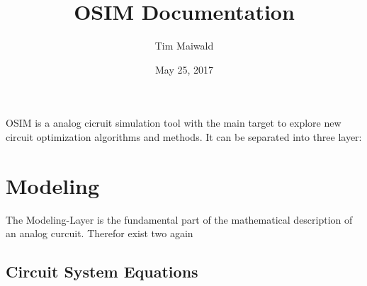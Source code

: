 \documentclass[letterpaper,12pt,english]{sphinxmanual}
\title{OSIM Documentation}
\date{May 25, 2017}
\author{Tim Maiwald}
\begin{document}
\maketitle
\sphinxtableofcontents
{}\label{\detokenize{index::doc}}


OSIM is a analog cicruit simulation tool with the main target to explore new circuit optimization algorithms and methods. It can be separated into three layer:


\chapter{Modeling}
\label{\detokenize{Modeling:welcome-to-osim-s-documentation}}\label{\detokenize{Modeling::doc}}\label{\detokenize{Modeling:modeling}}
The Modeling-Layer is the fundamental part of the mathematical description of an analog curcuit. Therefor exist two again


\section{Circuit System Equations}
\label{\detokenize{Modeling/CircuitSystemEquations:module-Modeling.CircuitSystemEquations}}\label{\detokenize{Modeling/CircuitSystemEquations::doc}}\label{\detokenize{Modeling/CircuitSystemEquations:circuit-system-equations}}
\end{document}
